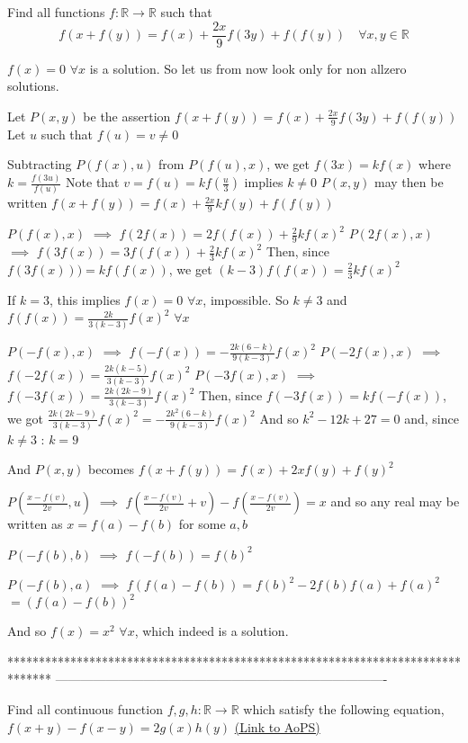 \begin{solution}
	\begin{tcolorbox}Find all functions $f: \mathbb{R}\to \mathbb{R}$ such that \[f(x+f(y))=f(x)+\frac{2x}{9}f(3y)+f(f(y))\quad \forall x,y\in\mathbb R \]\end{tcolorbox}
$\boxed{f(x)=0}$ $\forall x$ is a solution. So let us from now look only for non allzero solutions.

Let $P(x,y)$ be the assertion $f(x+f(y))=f(x)+\frac{2x}9f(3y)+f(f(y))$
Let $u$ such that $f(u)=v\ne 0$

Subtracting $P(f(x),u)$ from $P(f(u),x)$, we get $f(3x)=kf(x)$ where $k=\frac{f(3u)}{f(u)}$
Note that $v=f(u)=kf(\frac u3)$ implies $k\ne 0$
$P(x,y)$ may then be written $f(x+f(y))=f(x)+\frac{2x}9kf(y)+f(f(y))$

$P(f(x),x)$ $\implies$ $f(2f(x))=2f(f(x))+\frac{2}9kf(x)^2$
$P(2f(x),x)$ $\implies$ $f(3f(x))=3f(f(x))+\frac{2}3kf(x)^2$
Then, since $f(3f(x)))=kf(f(x))$, we get $(k-3)f(f(x))=\frac{2}3kf(x)^2$

If $k=3$, this implies $f(x)=0$ $\forall x$, impossible. So $k\ne 3$ and  $f(f(x))=\frac{2k}{3(k-3)}f(x)^2$ $\forall x$

$P(-f(x),x)$ $\implies$ $f(-f(x))=-\frac{2k(6-k)}{9(k-3)}f(x)^2$
$P(-2f(x),x)$ $\implies$ $f(-2f(x))=\frac{2k(k-5)}{3(k-3)}f(x)^2$
$P(-3f(x),x)$ $\implies$ $f(-3f(x))=\frac{2k(2k-9)}{3(k-3)}f(x)^2$
Then, since $f(-3f(x))=kf(-f(x))$, we got $\frac{2k(2k-9)}{3(k-3)}f(x)^2=-\frac{2k^2(6-k)}{9(k-3)}f(x)^2$
And so $k^2-12k+27=0$ and, since $k\ne 3$ : $k=9$ 

And $P(x,y)$ becomes $f(x+f(y))=f(x)+2xf(y)+f(y)^2$


$P(\frac{x-f(v)}{2v},u)$ $\implies$ $f(\frac{x-f(v)}{2v}+v)-f(\frac{x-f(v)}{2v})=x$ and so any real may be written as $x=f(a)-f(b)$ for some $a,b$

$P(-f(b),b)$ $\implies$ $f(-f(b))=f(b)^2$

$P(-f(b),a)$ $\implies$ $f(f(a)-f(b))=f(b)^2-2f(b)f(a)+f(a)^2$ $=(f(a)-f(b))^2$

And so $\boxed{f(x)=x^2}$ $\forall x$, which indeed is a solution.
\end{solution}
*******************************************************************************
-------------------------------------------------------------------------------

\begin{problem}
	Find all continuous function $f,g,h:\mathbb{R} \to \mathbb{R}$ which satisfy the following equation,
           $f(x+y)-f(x-y)=2 g(x)h(y)$
	\flushright \href{https://artofproblemsolving.com/community/c6h568387}{(Link to AoPS)}
\end{problem}




